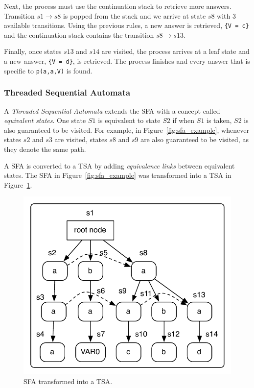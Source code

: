 Next, the process must use the continuation stack to retrieve more answers. Transition $s1 \rightarrow s8$ is popped from the stack
and we arrive at state $s8$ with 3 available transitions. Using the previous rules, a new answer is retrieved,
\texttt{\{V~=~c\}} and the continuation stack contains the transition $s8 \rightarrow s13$.

Finally, once states $s13$ and $s14$ are visited, the process arrives at a leaf state and a new answer,
\texttt{\{V~=~d\}}, is retrieved. The process finishes and every answer that is specific to \texttt{p(a,a,V)} is found.

\subsubsection{Threaded Sequential Automata}

A \textit{Threaded Sequential Automata} extends the SFA with a concept called
\textit{equivalent states}. One state $S1$ is equivalent to state $S2$ if when $S1$ is taken, $S2$ is also
guaranteed to be visited. For example, in Figure~\ref{fig:sfa_example}, whenever states $s2$ and $s3$ are
visited, states $s8$ and $s9$ are also guaranteed to be visited, as they denote the same path.

A SFA is converted to a TSA by adding \textit{equivalence links} between equivalent states.
The SFA in Figure~\ref{fig:sfa_example} was transformed into a TSA in Figure~\ref{fig:tsa_example}.

\begin{figure}[ht]
  \centering
    \includegraphics[scale=0.6]{tsa.pdf}
  \caption{SFA transformed into a TSA.}
  \label{fig:tsa_example}
\end{figure}

